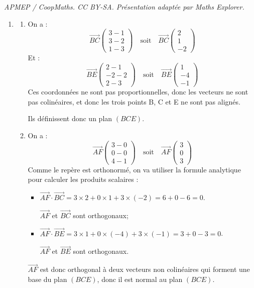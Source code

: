 \documentclass[10pt]{article}
\providecommand{\vect}[1]{\overrightarrow{#1}}
\begin{document}
\noindent\textit{APMEP / CoopMaths. CC BY-SA. Présentation adaptée par Maths Explorer.}\par\medskip
\begin{enumerate}
\item \begin{enumerate}
\item On a :
\[
\vect{BC}\begin{pmatrix}3-1\\3-2\\1-3\end{pmatrix}\quad \text{soit}\quad \vect{BC}\begin{pmatrix}2\\1\\-2\end{pmatrix}
\]
Et :
\[
\vect{BE}\begin{pmatrix}2-1\\-2-2\\2-3\end{pmatrix}\quad \text{soit}\quad \vect{BE}\begin{pmatrix}1\\-4\\-1\end{pmatrix}
\]
Ces coordonnées ne sont pas proportionnelles, donc les vecteurs ne sont pas colinéaires, et donc les trois points B, C et E ne sont pas alignés.

Ils définissent donc un plan $(BCE)$.

\item On a :
\[
\vect{AF}\begin{pmatrix}3-0\\0-0\\4-1\end{pmatrix}\quad \text{soit}\quad \vect{AF}\begin{pmatrix}3\\0\\3\end{pmatrix}
\]
Comme le repère est orthonormé, on va utiliser la formule analytique pour calculer les produits scalaires :
\begin{itemize}
\item $\vect{AF}\cdot \vect{BC}=3\times 2+0\times 1+3\times(-2)=6+0-6=0$.

$\vect{AF}$ et $\vect{BC}$ sont orthogonaux;
\item $\vect{AF}\cdot \vect{BE}=3\times 1+0\times(-4)+3\times(-1)=3+0-3=0$.

$\vect{AF}$ et $\vect{BE}$ sont orthogonaux.
\end{itemize}
$\vect{AF}$ est donc orthogonal à deux vecteurs non colinéaires qui forment une base du plan $(BCE)$, donc il est normal au plan $(BCE)$.


\end{enumerate}
\end{enumerate}
\end{document}
